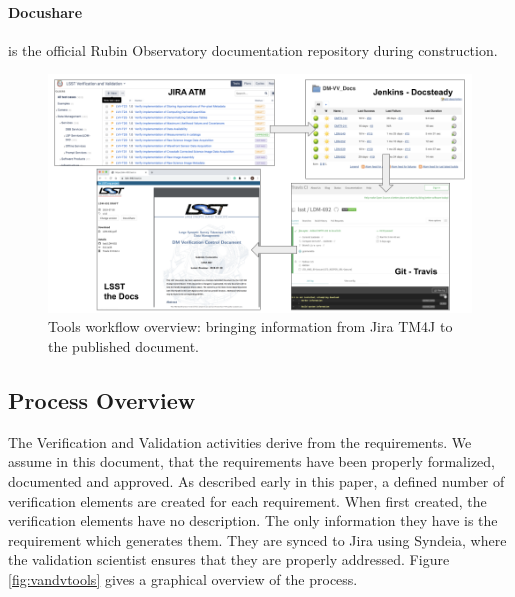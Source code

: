 \paragraph{Docushare}
is the official Rubin Observatory documentation repository during construction.

\begin{figure}
\begin{center}
\includegraphics[width=\textwidth]{imgs/screenshots.png}
 \caption{Tools workflow overview: bringing information from Jira TM4J to the published document.}
 \label{fig:overview}
\end{center}
\end{figure}


\subsection{Process Overview}\label{sec:proc}

The Verification and Validation activities derive from the requirements.
We assume in this document, that the requirements have been properly formalized, documented and approved.
As described early in this paper, a defined number of verification elements are created for each requirement.
When first created, the verification elements have no description.
The only information they have is the requirement which generates them.
They are synced to Jira using Syndeia, where the validation scientist ensures that they are properly addressed.
Figure  \ref{fig:vandvtools} gives a graphical overview of the process.

